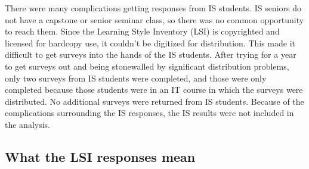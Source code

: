 There were many complications getting responses from IS students. IS seniors do not have a capstone or senior seminar class, so there was no common opportunity to reach them. Since the Learning Style Inventory (LSI) is copyrighted and licensed for hardcopy use, it couldn't be digitized for distribution. This made it difficult to get surveys into the hands of the IS students. After trying for a year to get surveys out and being stonewalled by significant distribution problems, only two surveys from IS students were completed, and those were only completed because those students were in an IT course in which the surveys were distributed. No additional surveys were returned from IS students. Because of the complications surrounding the IS responses, the IS results were not included in the analysis.

\subsection{What the LSI responses mean}
